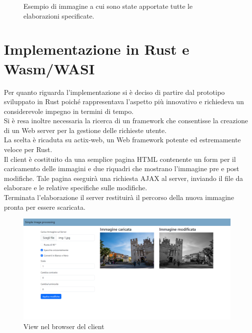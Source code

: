 \begin{figure}
\begin{minipage}{.5\textwidth}
    \end{minipage}
    \caption[Esempio immagine pre/post elaborazione]{Esempio di immagine a cui sono state apportate tutte le elaborazioni specificate.}
\end{figure}
\newpage
\section{Implementazione in Rust e Wasm/WASI}
Per quanto riguarda l'implementazione si è deciso di partire dal prototipo sviluppato in Rust poiché rappresentava l'aspetto più innovativo e richiedeva un considerevole impegno in termini di tempo.
\\Si è resa inoltre necessaria la ricerca di un framework che consentisse la creazione di un Web server per la gestione delle richieste utente.
\\La scelta è ricaduta su actix-web, un Web framework potente ed estremamente veloce per Rust.
\\Il client è costituito da una semplice pagina HTML contenente un form per il caricamento delle immagini e due riquadri che mostrano l'immagine pre e post modifiche.
Tale pagina eseguirà una richiesta AJAX al server, inviando il file da elaborare e le relative specifiche sulle modifiche.
\\Terminata l'elaborazione il server restituirà il percorso della nuova immagine pronta per essere scaricata.
\newpage
\begin{figure}
    \begin{center}
            \includegraphics[width=1\columnwidth]{images/client.png}
    \end{center}
    \caption{View nel browser del client}
    \label{fig:client}
\end{figure}
